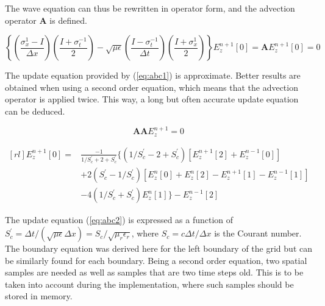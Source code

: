 The wave equation can thus be rewritten in operator form, and the advection operator $\boldsymbol{A}$ is defined.

\begin{equation}
	\left \{
	\left( \frac{\sigma_x^{1} - I}{\Delta x} \right) \left( \frac{I + \sigma_t^{-1}}{2}\right)  - \sqrt{\mu \epsilon}\left( \frac{I - \sigma_t^{-1}}{\Delta t} \right) \left( \frac{I + \sigma_x^{1}}{2}\right)
	\right\} E_z^{n+1} \left[0\right] = \boldsymbol{A} E_z^{n+1}[0] = 0
	\label{eq:abc1}
\end{equation}

The update equation provided by (\ref{eq:abc1}) is approximate. Better results are obtained when using a second order equation, which means that the advection operator is applied twice. This way, a long but often accurate update equation can be deduced.

\begin{equation}
	\boldsymbol{A} \boldsymbol{A} E_z^{n+1} = 0
\end{equation}

\begin{equation}
\begin{aligned}[rl]
	E_z^{n+1} \left[0\right] = &\frac{-1}{1/S_c^{'} + 2 + S_c^{'}} \{ (1/S_c^{'} - 2 + S_c^{'}) \left[ E_z^{n+1} \left[2\right] + E_z^{n-1} \left[0\right] \right]  \\
	 & + 2 ( S_c^{'} - 1/ S_c^{'}) \left[ E_z^{n} \left[0\right]  + E_z^{n} \left[2\right] - E_z^{n+1} \left[1\right] - E_z^{n-1} \left[1\right]\right] \\
	 & -4 (1/S_c^{'} + S_c^{'}) E_z^{n} \left[1\right] \} - E_z^{n-1} \left[2\right]
\end{aligned}
\label{eq:abc2}
\end{equation}

The update equation (\ref{eq:abc2}) is expressed as a function of $S_c^{'} = \Delta t / (\sqrt{\mu \epsilon} \Delta x) = S_c /\sqrt{\mu_r \epsilon_r} $, where $S_c = c \Delta t / \Delta x$ is the Courant number. The boundary equation was derived here for the left boundary of the grid but can be similarly found for each boundary. Being a second order equation, two spatial samples are needed as well as samples that are two time steps old. This is to be taken into account during the implementation, where such samples should be stored in memory.